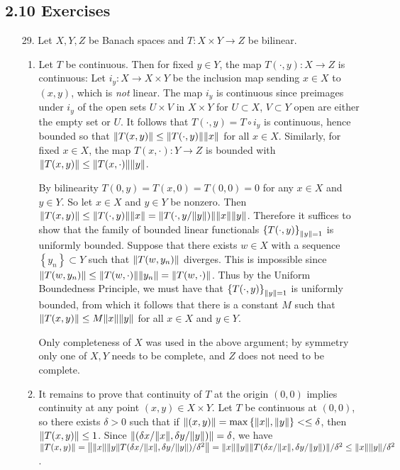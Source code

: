 \documentclass[11pt,leqno]{article}
\theoremstyle{plain}
\theoremstyle{definition}
\numberwithin{equation}{section}
\numberwithin{lem}{section}
\newcommand{\cbr}[1]{\left\{#1\right\}}
\begin{document}
\subsection*{2.10 Exercises}
\begin{enumerate}
  \item[29.] Let $X,Y,Z$ be Banach spaces and $T\colon X\times Y\to Z$ be bilinear.
  \begin{enumerate}
    \item Let $T$ be continuous. Then for fixed $y\in Y$, the map $T(\cdot,y)\colon X\to Z$ is continuous: Let $i_y\colon X\to X\times Y$ be the inclusion map sending $x\in X$ to $(x,y)$, which is \textit{not} linear. The map $i_y$ is continuous since preimages under $i_y$ of the open sets $U\times V$ in $X\times Y$ for $U\subset X$, $V\subset Y$ open are either the empty set or $U$. It follows that $T(\cdot,y) = T\circ i_y$ is continuous, hence bounded so that $\norm{T(x,y)}\leq \norm{T(\cdot,y)}\norm{x}$ for all $x\in X$. Similarly, for fixed $x\in X$, the map $T(x,\cdot)\colon Y\to Z$ is bounded with $\norm{T(x,y)}\leq \norm{T(x,\cdot)}\norm{y}$.
    
    By bilinearity $T(0,y) = T(x,0) = T(0,0) = 0$ for any $x\in X$ and $y\in Y$. So let $x\in X$ and $y\in Y$ be nonzero. Then $\norm{T(x,y)}\leq \norm{T(\cdot,y)}\norm{x} = \norm{T(\cdot,y/\norm{y})}\norm{x}\norm{y}$. Therefore it suffices to show that the family of bounded linear functionals $\cbr{T(\cdot,y)}_{\norm{y} = 1}$ is uniformly bounded. Suppose that there exists $w\in X$ with a sequence $\cbr{y_n}\subset Y$ such that $\norm{T(w,y_n)}$ diverges. This is impossible since $\norm{T(w,y_n)}\leq \norm{T(w,\cdot)}\norm{y_n} = \norm{T(w,\cdot)}$. Thus by the Uniform Boundedness Principle, we must have that $\cbr{T(\cdot,y)}_{\norm{y} = 1}$ is uniformly bounded, from which it follows that there is a constant $M$ such that $\norm{T(x,y)}\leq M\norm{x}\norm{y}$ for all $x\in X$ and $y\in Y$.

    Only completeness of $X$ was used in the above argument; by symmetry only one of $X,Y$ needs to be complete, and $Z$ does not need to be complete.

    \item It remains to prove that continuity of $T$ at the origin $(0,0)$ implies continuity at any point $(x,y)\in X\times Y$. Let $T$ be continuous at $(0,0)$, so there exists $\delta>0$ such that if $\norm{(x,y)} = \max\cbr{\norm{x},\norm{y}} <\leq \delta$, then $\norm{T(x,y)} \leq 1$. Since $\norm{(\delta x/\norm{x},\delta y/\norm{y})} = \delta$, we have $\norm{T(x,y)} = \norm{\norm{x}\norm{y}T(\delta x/\norm{x},\delta y/\norm{y})/\delta^2} = \norm{x}\norm{y}\norm{T(\delta x/\norm{x},\delta y/\norm{y})}/\delta^2\leq \norm{x}\norm{y}/\delta^2$.
    

\end{enumerate}
\end{enumerate}
\end{document}

